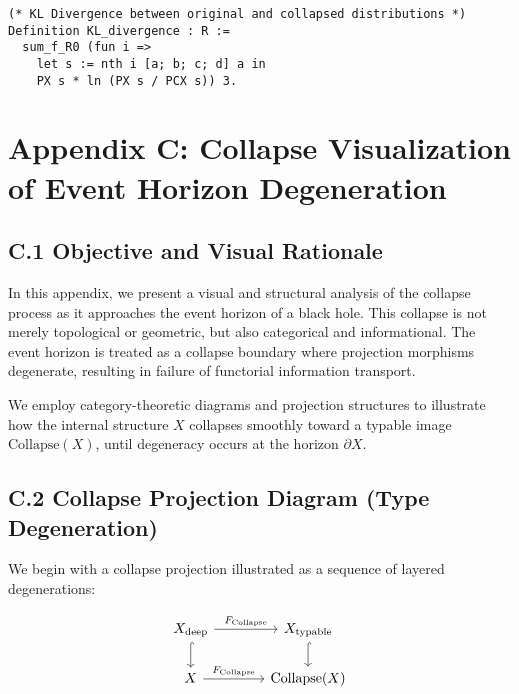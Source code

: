 \documentclass[11pt]{article}
\begin{document}
\begin{lstlisting}
(* KL Divergence between original and collapsed distributions *)
Definition KL_divergence : R :=
  sum_f_R0 (fun i =>
    let s := nth i [a; b; c; d] a in
    PX s * ln (PX s / PCX s)) 3.
\end{lstlisting}



\section*{Appendix C: Collapse Visualization of Event Horizon Degeneration}

\subsection*{C.1 Objective and Visual Rationale}

In this appendix, we present a visual and structural analysis of the collapse process as it approaches the event horizon of a black hole. This collapse is not merely topological or geometric, but also categorical and informational. The event horizon is treated as a collapse boundary where projection morphisms degenerate, resulting in failure of functorial information transport.

We employ category-theoretic diagrams and projection structures to illustrate how the internal structure \( X \) collapses smoothly toward a typable image \( \mathrm{Collapse}(X) \), until degeneracy occurs at the horizon \( \partial X \).

\subsection*{C.2 Collapse Projection Diagram (Type Degeneration)}

We begin with a collapse projection illustrated as a sequence of layered degenerations:

\[
\begin{tikzcd}[column sep=large]
X_{\text{deep}} \arrow[r, "F_{\text{Collapse}}"] \arrow[d, hook]
& X_{\text{typable}} \arrow[d, hook] \\
X \arrow[r, "F_{\text{Collapse}}"]
& \mathrm{Collapse}(X)
\end{tikzcd}
\]
\end{document}
